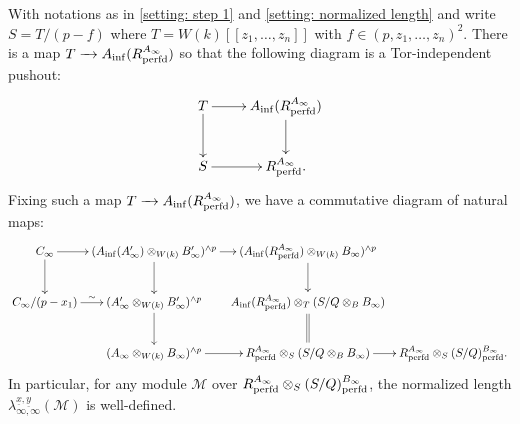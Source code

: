 \documentclass[12pt]{amsart}
\numberwithin{equation}{theorem}
\numberwithin{equation}{theorem}
\newcommand{\perfd}{\textnormal{perfd}}
\begin{document}
\begin{lemma}
\label{lem: Tor-independent}
With notations as in \autoref{setting: step 1} and \autoref{setting: normalized length} and write $S=T/(p-f)$ where $T= W(k)[[z_1,\dots,z_n]]$ with $f\in (p,z_1,\dots,z_n)^2$. There is a map $T\to A_{\inf}(R^{A_\infty}_\perfd)$ so that the following diagram is a Tor-independent pushout:
\[
\xymatrix{
T \ar[d] \ar[r] & A_{\inf}(R^{A_\infty}_\perfd) \ar[d] \\
S \ar[r] & R^{A_\infty}_\perfd.
}
\]
Fixing such a map $T\to A_{\inf}(R^{A_\infty}_\perfd)$, we have a commutative diagram of natural maps:
\[\xymatrix@C-=.5pc{
C_\infty \ar[r] \ar[d] & (A_{\inf}(A_\infty') \otimes_{W(k)}B_\infty')^{\wedge p} \ar[r] \ar[d] & (A_{\inf}(R^{A_\infty}_\perfd) \otimes_{W(k)} B_\infty)^{\wedge p}  \ar[d]   \\
C_\infty/(p-x_1) \ar[r]^-{\sim} & (A_\infty' \otimes_{W(k)} B_\infty')^{\wedge p} \ar[d] & A_{\inf}(R^{A_\infty}_\perfd) \otimes_T(S/Q \otimes_BB_\infty) \ar@{=}[d]  \\
& (A_\infty \otimes_{W(k)} B_\infty)^{\wedge p} \ar[r] & R^{A_\infty}_\perfd \otimes_S(S/Q\otimes_BB_\infty) \ar[r] & R^{A_\infty}_\perfd \otimes_S(S/Q)^{B_\infty}_\perfd.
}\]
In particular, for any module $\mathcal{M}$ over $R^{A_\infty}_\perfd \otimes_S(S/Q)^{B_\infty}_\perfd$, the normalized length $\lambda_{\infty, \infty}^{\underline{x}, \underline{y}}(\mathcal{M})$ is well-defined.
\end{lemma}
\end{document}

